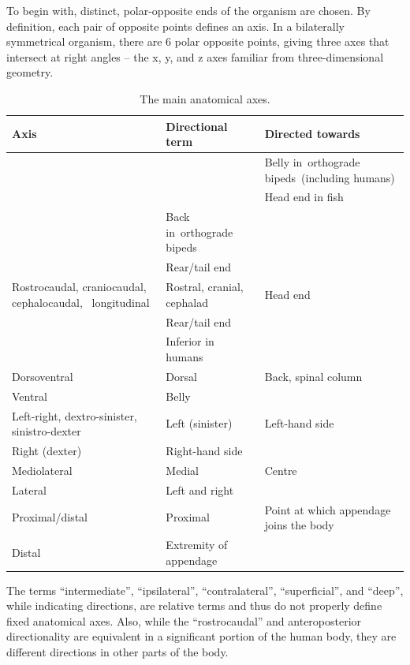 To begin with, distinct, polar-opposite ends of the organism are chosen. By definition, each pair of opposite points defines an axis. In a bilaterally symmetrical organism, there are 6 polar opposite points, giving three axes that intersect at right angles -- the x, y, and z axes familiar from three-dimensional geometry.
\onecolumn
\begin{longtable}[t]{>{\raggedright\arraybackslash}p{15em}>{\raggedright\arraybackslash}p{10em}>{\raggedright\arraybackslash}p{10em}}
\caption{\label{tab:axes}The main anatomical axes.}\\
\toprule
Axis & Directional term & Directed towards\\
\midrule
\rowcolor{gray!6}   &  & Belly in orthograde bipeds (including humans)\\

\multirow{-2}{15em}{\raggedright\arraybackslash Anteroposterior} & \multirow{-2}{10em}{\raggedright\arraybackslash Anterior} & Head end in fish\\
\cmidrule{1-3}
\rowcolor{gray!6}   & Back in orthograde bipeds & \\

\multirow{-2}{15em}{\raggedright\arraybackslash Posterior} & Rear/tail end & \\
\cmidrule{1-3}
\rowcolor{gray!6}  Rostrocaudal, craniocaudal, cephalocaudal,  longitudinal & Rostral, cranial, cephalad & Head end\\
\cmidrule{1-3}
 & Rear/tail end & \\

\rowcolor{gray!6}  \multirow{-2}{15em}{\raggedright\arraybackslash Caudal} & Inferior in humans & \\
\cmidrule{1-3}
Dorsoventral & Dorsal & Back, spinal column\\
\cmidrule{1-3}
\rowcolor{gray!6}  Ventral & Belly & \\
\cmidrule{1-3}
Left-right, dextro-sinister, sinistro-dexter & Left (sinister) & Left-hand side\\
\cmidrule{1-3}
\rowcolor{gray!6}  Right (dexter) & Right-hand side & \\
\cmidrule{1-3}
Mediolateral & Medial & Centre\\
\cmidrule{1-3}
\rowcolor{gray!6}  Lateral & Left and right & \\
\cmidrule{1-3}
Proximal/distal & Proximal & Point at which appendage joins the body\\
\cmidrule{1-3}
\rowcolor{gray!6}  Distal & Extremity of appendage & \\
\bottomrule
\end{longtable}
\twocolumn
The terms ``intermediate'', ``ipsilateral'', ``contralateral'', ``superficial'', and ``deep'', while indicating directions, are relative terms and thus do not properly define fixed anatomical axes. Also, while the ``rostrocaudal'' and anteroposterior directionality are equivalent in a significant portion of the human body, they are different directions in other parts of the body.

